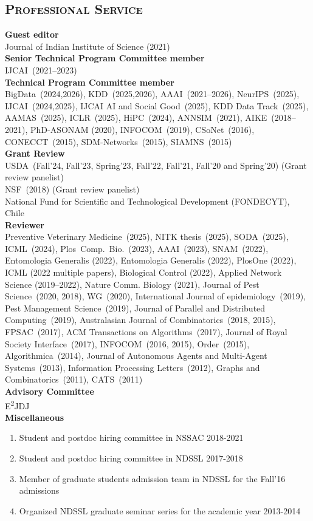 \documentclass[margin,10pt]{res} %
\begin{document}
\begin{resume}
\section{\textnormal{\textsc{Professional Service}}}
\noindent\textbf{Guest editor}\\
Journal of Indian Institute of Science (2021)
\smallskip\\
\noindent\textbf{Senior Technical Program Committee member}\\ 
IJCAI~(2021--2023)
\smallskip\\
\noindent\textbf{Technical Program Committee member}\\ 
BigData~(2024,2026), KDD~(2025,2026), AAAI~(2021--2026), NeurIPS~(2025),
IJCAI~(2024,2025), IJCAI AI and Social Good~(2025), KDD Data
Track~(2025), AAMAS~(2025), ICLR~(2025), HiPC~(2024),
ANNSIM~(2021), AIKE~(2018--2021), PhD-ASONAM (2020),
INFOCOM~(2019), CSoNet~(2016), CONECCT~(2015), SDM-Networks~(2015),
SIAMNS~(2015)\smallskip\\
\noindent\textbf{Grant Review}\\
USDA~(Fall'24, Fall'23, Spring'23, Fall'22, Fall'21, Fall'20 and Spring'20) (Grant review panelist)\\
NSF~(2018) (Grant review panelist)\\
National Fund for Scientific and Technological Development (FONDECYT),
Chile\smallskip\\
\noindent\textbf{Reviewer}\\ 
\noindent
Preventive Veterinary Medicine~(2025), 
NITK thesis~(2025),
SODA~(2025),
ICML~(2024),
Plos~Comp.~Bio.~(2023),
AAAI~(2023),
SNAM~(2022),
Entomologia Generalis (2022),
Entomologia Generalis (2022),
PlosOne (2022),
ICML (2022 multiple papers),
Biological Control (2022),
Applied Network Science (2019--2022),
Nature Comm. Biology (2021),
Journal of Pest Science~(2020, 2018), 
WG~(2020),
International Journal of epidemiology~(2019),
Pest Management Science~(2019), 
Journal of Parallel and Distributed Computing~(2019), 
Australasian Journal of Combinatorics~(2018, 2015),
FPSAC~(2017),
ACM Transactions on Algorithms~(2017),
Journal of Royal Society Interface~(2017), INFOCOM~(2016, 2015), Order~(2015), 
Algorithmica~(2014), Journal of Autonomous Agents and Multi-Agent
Systems~(2013), 
Information Processing Letters~(2012), 
Graphs and
Combinatorics~(2011), CATS~(2011)\smallskip\\
\noindent\textbf{Advisory Committee}\\
E\textsuperscript{2}JDJ\bigskip\\
\noindent\textbf{Miscellaneous}\\ 
\begin{enumerate}[$\circ$]
\item Student and postdoc hiring committee in NSSAC 2018-2021
\item Student and postdoc hiring committee in NDSSL 2017-2018
\item Member of graduate students admission team in NDSSL for the Fall'16
admissions
\item Organized NDSSL graduate seminar series for the academic year 2013-2014
\end{enumerate}
\end{resume}

\end{document}
